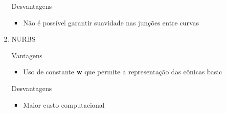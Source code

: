\begin{enumerate}
\begin{enumerate}[label=\alph*)]
		Desvantagens
		
		\begin{itemize}
			\item Não é possível garantir suavidade nas junções entre curvas
		\end{itemize}	
		
		\item NURBS
	
		Vantagens
		\begin{itemize}
			\item Uso de constante \textbf{w} que permite
			a representação das cônicas basic
		\end{itemize}				
		
		Desvantagens
		
		\begin{itemize}
			\item Maior custo computacional
		\end{itemize}	
		\end{enumerate}
		
	\end{enumerate}